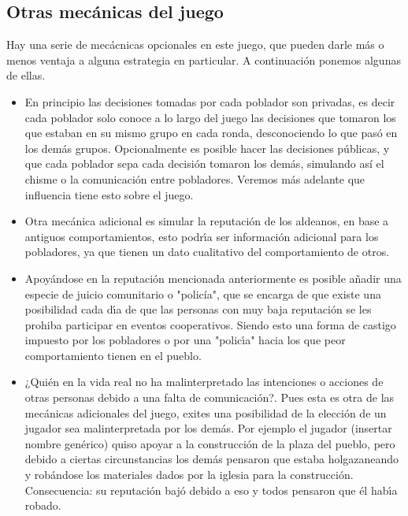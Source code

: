 \documentclass{article}
\begin{document}
\subsection{Otras mec\'anicas del juego}
Hay una serie de mec\'acnicas opcionales en este juego, que pueden darle m\'as o menos ventaja a alguna estrategia en particular.
A continuaci\'on ponemos algunas de ellas.
\begin{itemize}
    \item En principio las decisiones tomadas por cada poblador son privadas, es decir cada poblador solo conoce a lo largo del juego las decisiones
          que tomaron los que estaban en su mismo grupo en cada ronda, desconociendo lo que pas\'o en los dem\'as grupos. Opcionalmente es posible hacer las
          decisiones p\'ublicas, y que cada poblador sepa cada decisi\'on tomaron los dem\'as, simulando as\'i el chisme o la comunicaci\'on entre pobladores.
          Veremos m\'as adelante que influencia tiene esto sobre el juego.
    \item Otra mec\'anica adicional es simular la reputaci\'on de los aldeanos, en base a antiguos comportamientos, esto podr\'{\i}a ser informaci\'on
          adicional para los pobladores, ya que tienen un dato cualitativo del comportamiento de otros.
    \item Apoy\'andose en la reputaci\'on mencionada anteriormente es posible a\~nadir una especie de juicio comunitario o "polic\'ia", que se encarga de que existe una posibilidad
          cada d\'{\i}a de que las personas con muy baja reputaci\'on se les prohiba participar en eventos cooperativos. Siendo esto una forma de castigo impuesto
          por los pobladores o por una "polic\'{\i}a" hacia los que peor comportamiento tienen en el pueblo.
    \item ¿Qui\'en en la vida real no ha malinterpretado las intenciones o acciones de otras personas debido a una falta de comunicaci\'on?. Pues esta es otra de las
          mec\'anicas adicionales del juego, exites una posibilidad de la elecci\'on de un jugador sea malinterpretada por los dem\'as. Por ejemplo el jugador (insertar nombre gen\'erico)
          quiso apoyar a la construcci\'on de la plaza del pueblo, pero debido a ciertas circunstancias los dem\'as pensaron que estaba holgazaneando y rob\'andose los
          materiales dados por la iglesia para la construcci\'on. Consecuencia: su reputaci\'on baj\'o debido a eso y todos pensaron que \'el hab\'{\i}a robado.
\end{itemize}
\newpage
\end{document}
